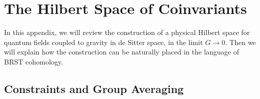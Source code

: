 \documentclass[11pt,a4paper]{article}
\begin{document}
  
  \section{The Hilbert Space of Coinvariants}\label{coinvariants}
  
  In this appendix, we will review the construction \cite{higuchi,marolf} of a physical Hilbert space for quantum fields 
  coupled to gravity in de Sitter space, in the limit $G\to 0$.  
  Then we will explain how the construction can be naturally placed in the language of BRST cohomology.  
  
  \subsection{Constraints and Group Averaging}\label{averaging}
  
\end{document}
